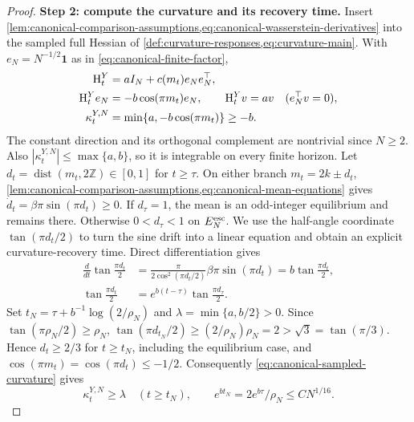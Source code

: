 \begin{proof}
\par\noindent\textbf{Step 2: compute the curvature and its recovery time.}
Insert \cref{lem:canonical-comparison-assumptions,eq:canonical-wasserstein-derivatives}
into the sampled full Hessian of \cref{def:curvature-responses,eq:curvature-main}.
With $e_N=N^{-1/2}\mathbf1$ as in \eqref{eq:canonical-finite-factor},
\begin{equation}
 \begin{split}
 \mathrm{H}_t^Y&=aI_N+c(m_t)e_Ne_N^\top,\\
 \mathrm{H}_t^Ye_N&=-b\cos(\pi m_t)e_N,\qquad
 \mathrm{H}_t^Yv=av\quad(e_N^\top v=0),\\
 \kappa_t^{Y,N}&=\min\{a,-b\cos(\pi m_t)\}\ge-b.
 \end{split}
 \label{eq:canonical-sampled-curvature}
\end{equation}
The constant direction and its orthogonal complement are nontrivial since $N\ge2$.
Also $|\kappa_t^{Y,N}|\le\max\{a,b\}$, so it is integrable on every
finite horizon.
Let $d_t=\operatorname{dist}(m_t,2\mathbb Z)\in[0,1]$ for $t\ge\tau$.
On either branch $m_t=2k\pm d_t$,
\cref{lem:canonical-comparison-assumptions,eq:canonical-mean-equations}
gives $\dot d_t=\beta\pi\sin(\pi d_t)\ge0$.
If $d_\tau=1$, the mean is an odd-integer equilibrium and remains there.
Otherwise $0<d_\tau<1$ on $E_N^{\rm esc}$.
We use the half-angle coordinate $\tan(\pi d_t/2)$ to turn the sine drift
into a linear equation and obtain an explicit curvature-recovery time.
Direct differentiation gives
\begin{equation}
 \begin{split}
 \frac d{dt}\tan\frac{\pi d_t}{2}
 &=\frac{\pi}{2\cos^2(\pi d_t/2)}\beta\pi\sin(\pi d_t)
   =b\tan\frac{\pi d_t}{2},\\
 \tan\frac{\pi d_t}{2}&=e^{b(t-\tau)}\tan\frac{\pi d_\tau}{2}.
 \end{split}
 \label{eq:canonical-mean-solution}
\end{equation}
Set $t_N=\tau+b^{-1}\log(2/\rho_N)$ and $\lambda=\min\{a,b/2\}>0$.
Since $\tan(\pi\rho_N/2)\ge\rho_N$,
$\tan(\pi d_{t_N}/2)\ge(2/\rho_N)\rho_N=2>\sqrt3=\tan(\pi/3)$.
Hence $d_t\ge2/3$ for $t\ge t_N$, including the equilibrium case,
and $\cos(\pi m_t)=\cos(\pi d_t)\le-1/2$.
Consequently \eqref{eq:canonical-sampled-curvature} gives
\begin{equation}
 \kappa_t^{Y,N}\ge\lambda\quad(t\ge t_N),\qquad
 e^{bt_N}=2e^{b\tau}/\rho_N\le CN^{1/16}.
 \label{eq:canonical-curvature-recovery}
\end{equation}


\end{proof}
